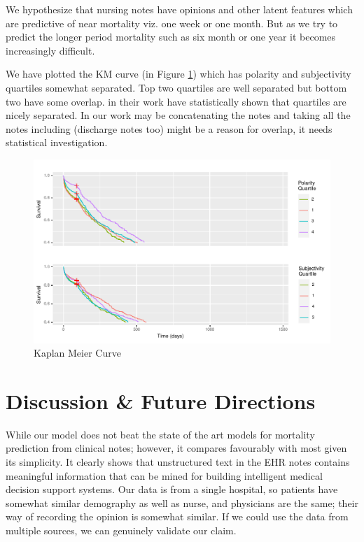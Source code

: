\documentclass[11pt,a4paper]{article}
\begin{document}
 We hypothesize that nursing notes have opinions and other latent features which are predictive of near mortality viz. one week or one month. But as we try to predict the longer period mortality such as six month or one year  it becomes increasingly difficult. 

We have plotted the KM curve (in Figure \ref{fig:km}) which has  
polarity and subjectivity quartiles somewhat separated. Top two quartiles are well separated but bottom two have some overlap. \citet{Smith18} in their work have statistically shown that quartiles are nicely separated. In our work may be concatenating the notes and taking all the notes including (discharge notes too) might be a reason for overlap, it needs statistical investigation. 

\begin{figure}[h!]
	\centering
	\includegraphics[width=\linewidth]{km.pdf}
	\caption{Kaplan Meier Curve}
	\label{fig:km}
\end{figure}
\section{Discussion \& Future Directions}
While our model does not beat the state
 of the art models for mortality prediction from clinical notes; however,
it compares favourably with most given its simplicity. It clearly shows that unstructured text in the EHR notes contains meaningful information that can be mined for building intelligent medical decision support systems.
Our data is from a single hospital, so patients have somewhat similar demography as well as nurse, and physicians are the same; their way of recording the opinion is somewhat similar. If we could use the data from multiple sources, we can genuinely validate our claim.
\end{document}
